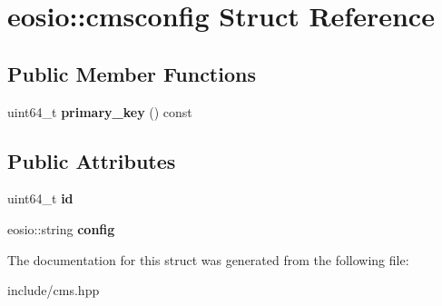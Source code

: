 \hypertarget{structeosio_1_1cmsconfig}{}\section{eosio\+:\+:cmsconfig Struct Reference}
\label{structeosio_1_1cmsconfig}
\subsection*{Public Member Functions}
\begin{DoxyCompactItemize}
\item 
\mbox{\label{structeosio_1_1cmsconfig_a2a6fc70d36e677aee1a170851b4915a9}} 
uint64\+\_\+t {\bfseries primary\+\_\+key} () const
\end{DoxyCompactItemize}
\subsection*{Public Attributes}
\begin{DoxyCompactItemize}
\item 
\mbox{\label{structeosio_1_1cmsconfig_ac04c5db51b880970500c5b44db03a39d}} 
uint64\+\_\+t {\bfseries id}
\item 
\mbox{\label{structeosio_1_1cmsconfig_a0c7c2e7be6aced2e83a1a40b5f1d1c3b}} 
eosio\+::string {\bfseries config}
\end{DoxyCompactItemize}


The documentation for this struct was generated from the following file\+:\begin{DoxyCompactItemize}
\item 
include/cms.\+hpp\end{DoxyCompactItemize}
